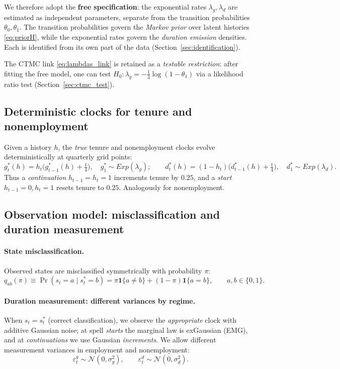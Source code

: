 \documentclass[12pt]{article}
\begin{document}
We therefore adopt the \textbf{free specification}: the exponential rates \(\lambda_g, \lambda_d\) are estimated as independent parameters, separate from the transition probabilities \(\theta_0, \theta_1\). The transition probabilities govern the \emph{Markov prior} over latent histories \eqref{eq:priorH}, while the exponential rates govern the \emph{duration emission} densities. Each is identified from its own part of the data (Section~\ref{sec:identification}).

The CTMC link \eqref{eq:lambdas_link} is retained as a \emph{testable restriction}: after fitting the free model, one can test \(H_0: \lambda_g = -\tfrac{1}{3}\log(1-\theta_1)\) via a likelihood ratio test (Section~\ref{sec:ctmc_test}).

\subsection{Deterministic clocks for tenure and nonemployment}
Given a history \(h\), the \emph{true} tenure and nonemployment clocks evolve deterministically at quarterly grid points:
\begin{equation}
g_t^*(h)=h_t\big(g_{t-1}^*(h)+\tfrac{1}{4}\big),\quad g_1^*\sim Exp(\lambda_g) ;\qquad
d_t^*(h)=(1-h_t)\big(d_{t-1}^*(h)+\tfrac{1}{4}\big),\quad d_1^*\sim Exp(\lambda_d).
\label{eq:deterministic_clocks}
\end{equation}
Thus a \emph{continuation} \(h_{t-1}=h_t=1\) increments tenure by \(0.25\), and a \emph{start} \(h_{t-1}=0,h_t=1\) resets tenure to \(0.25\). Analogously for nonemployment.

\subsection{Observation model: misclassification and duration measurement}
\paragraph{State misclassification.}
Observed states are misclassified symmetrically with probability \(\pi\):
\begin{equation}
q_{ab}(\pi)\equiv \Pr(s_{t}=a\mid s_{t}^*=b)=
\pi\mathbf{1}\{a\neq b\}+(1-\pi)\mathbf{1}\{a=b\},\qquad a,b\in\{0,1\}.
\label{eq:q_misclass}
\end{equation}

\paragraph{Duration measurement: different variances by regime.}
When \(s_{t}=s_{t}^*\) (correct classification), we observe the \emph{appropriate} clock with additive Gaussian noise; at spell \emph{starts} the marginal law is exGaussian (EMG), and at \emph{continuations} we use Gaussian \emph{increments}. We allow different measurement variances in employment and nonemployment:
\begin{equation}
\varepsilon^g_{t}\sim \mathcal{N}(0,\sigma_g^2),\qquad
\varepsilon^d_{t}\sim \mathcal{N}(0,\sigma_d^2).
\label{eq:regime_sigmas}
\end{equation}
\end{document}
